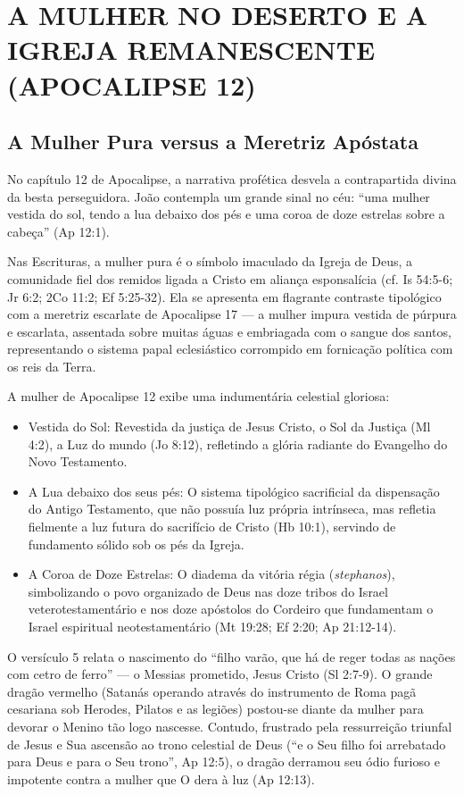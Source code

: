 \documentclass[11pt,a4paper,openany]{book}
\begin{document}
\section{A MULHER NO DESERTO E A IGREJA REMANESCENTE (APOCALIPSE 12)}



\subsection{A Mulher Pura versus a Meretriz Apóstata}


No capítulo 12 de Apocalipse, a narrativa profética desvela a contrapartida divina da besta perseguidora. João contempla um grande sinal no céu: ``uma mulher vestida do sol, tendo a lua debaixo dos pés e uma coroa de doze estrelas sobre a cabeça'' (Ap 12:1).

Nas Escrituras, a mulher pura é o símbolo imaculado da Igreja de Deus, a comunidade fiel dos remidos ligada a Cristo em aliança esponsalícia (cf. Is 54:5-6; Jr 6:2; 2Co 11:2; Ef 5:25-32). Ela se apresenta em flagrante contraste tipológico com a meretriz escarlate de Apocalipse 17 — a mulher impura vestida de púrpura e escarlata, assentada sobre muitas águas e embriagada com o sangue dos santos, representando o sistema papal eclesiástico corrompido em fornicação política com os reis da Terra.

A mulher de Apocalipse 12 exibe uma indumentária celestial gloriosa:
\begin{itemize}
  \item Vestida do Sol: Revestida da justiça de Jesus Cristo, o Sol da Justiça (Ml 4:2), a Luz do mundo (Jo 8:12), refletindo a glória radiante do Evangelho do Novo Testamento.
  \item A Lua debaixo dos seus pés: O sistema tipológico sacrificial da dispensação do Antigo Testamento, que não possuía luz própria intrínseca, mas refletia fielmente a luz futura do sacrifício de Cristo (Hb 10:1), servindo de fundamento sólido sob os pés da Igreja.
  \item A Coroa de Doze Estrelas: O diadema da vitória régia (\textit{stephanos}), simbolizando o povo organizado de Deus nas doze tribos do Israel veterotestamentário e nos doze apóstolos do Cordeiro que fundamentam o Israel espiritual neotestamentário (Mt 19:28; Ef 2:20; Ap 21:12-14).
\end{itemize}


O versículo 5 relata o nascimento do ``filho varão, que há de reger todas as nações com cetro de ferro'' — o Messias prometido, Jesus Cristo (Sl 2:7-9). O grande dragão vermelho (Satanás operando através do instrumento de Roma pagã cesariana sob Herodes, Pilatos e as legiões) postou-se diante da mulher para devorar o Menino tão logo nascesse. Contudo, frustrado pela ressurreição triunfal de Jesus e Sua ascensão ao trono celestial de Deus (``e o Seu filho foi arrebatado para Deus e para o Seu trono'', Ap 12:5), o dragão derramou seu ódio furioso e impotente contra a mulher que O dera à luz (Ap 12:13).
\end{document}
